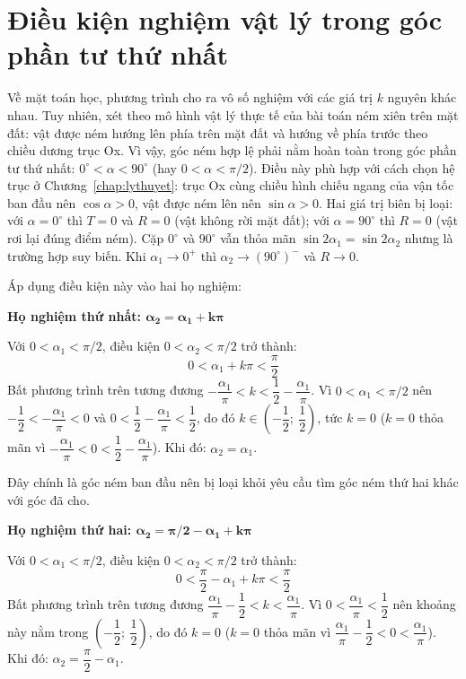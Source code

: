 \section{Điều kiện nghiệm vật lý trong góc phần tư thứ nhất}
Về mặt toán học, phương trình cho ra vô số nghiệm với các giá trị $k$ nguyên khác nhau. Tuy nhiên, xét theo mô hình vật lý thực tế của bài toán ném xiên trên mặt đất: vật được ném hướng lên phía trên mặt đất và hướng về phía trước theo chiều dương trục Ox. Vì vậy, góc ném hợp lệ phải nằm hoàn toàn trong góc phần tư thứ nhất: $0^\circ < \alpha < 90^\circ$ (hay $0 < \alpha < \pi/2$). Điều này phù hợp với cách chọn hệ trục ở Chương~\ref{chap:lythuyet}: trục Ox cùng chiều hình chiếu ngang của vận tốc ban đầu nên $\cos\alpha > 0$, vật được ném lên nên $\sin\alpha > 0$. Hai giá trị biên bị loại: với $\alpha = 0^\circ$ thì $T = 0$ và $R = 0$ (vật không rời mặt đất); với $\alpha = 90^\circ$ thì $R = 0$ (vật rơi lại đúng điểm ném). Cặp $0^\circ$ và $90^\circ$ vẫn thỏa mãn $\sin 2\alpha_1 = \sin 2\alpha_2$ nhưng là trường hợp suy biến. Khi $\alpha_1 \to 0^+$ thì $\alpha_2 \to (90^\circ)^-$ và $R \to 0$.

Áp dụng điều kiện này vào hai họ nghiệm:

\textbf{Họ nghiệm thứ nhất: $\boldsymbol{\alpha_2 = \alpha_1 + k\pi}$}

Với $0 < \alpha_1 < \pi/2$, điều kiện $0 < \alpha_2 < \pi/2$ trở thành:
\[ 0 < \alpha_1 + k\pi < \frac{\pi}{2} \]
Bất phương trình trên tương đương $-\dfrac{\alpha_1}{\pi} < k < \dfrac{1}{2} - \dfrac{\alpha_1}{\pi}$. Vì $0 < \alpha_1 < \pi/2$ nên $-\dfrac{1}{2} < -\dfrac{\alpha_1}{\pi} < 0$ và $0 < \dfrac{1}{2} - \dfrac{\alpha_1}{\pi} < \dfrac{1}{2}$, do đó $k \in \left(-\dfrac{1}{2};\ \dfrac{1}{2}\right)$, tức $k = 0$ ($k = 0$ thỏa mãn vì $-\dfrac{\alpha_1}{\pi} < 0 < \dfrac{1}{2} - \dfrac{\alpha_1}{\pi}$). Khi đó: $\alpha_2 = \alpha_1$.

Đây chính là góc ném ban đầu nên bị loại khỏi yêu cầu tìm góc ném thứ hai khác với góc đã cho.

\textbf{Họ nghiệm thứ hai: $\boldsymbol{\alpha_2 = \pi/2 - \alpha_1 + k\pi}$}

Với $0 < \alpha_1 < \pi/2$, điều kiện $0 < \alpha_2 < \pi/2$ trở thành:
\[ 0 < \frac{\pi}{2} - \alpha_1 + k\pi < \frac{\pi}{2} \]
Bất phương trình trên tương đương $\dfrac{\alpha_1}{\pi} - \dfrac{1}{2} < k < \dfrac{\alpha_1}{\pi}$. Vì $0 < \dfrac{\alpha_1}{\pi} < \dfrac{1}{2}$ nên khoảng này nằm trong $\left(-\dfrac{1}{2};\ \dfrac{1}{2}\right)$, do đó $k = 0$ ($k = 0$ thỏa mãn vì $\dfrac{\alpha_1}{\pi} - \dfrac{1}{2} < 0 < \dfrac{\alpha_1}{\pi}$). Khi đó: $\alpha_2 = \dfrac{\pi}{2} - \alpha_1$.

